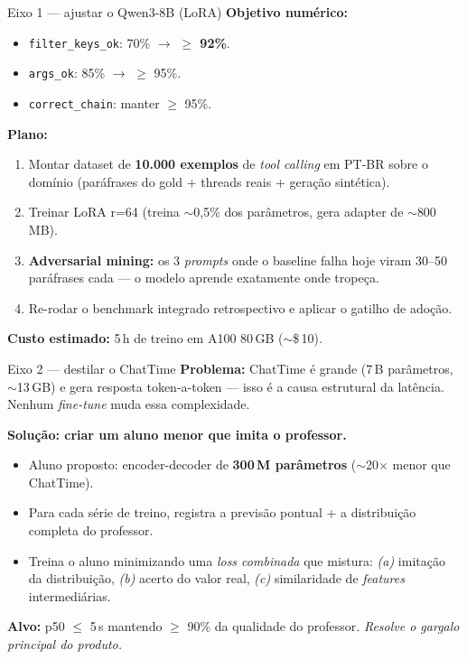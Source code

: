 \documentclass[10pt,aspectratio=169]{beamer}
\newcommand{\code}[1]{\texttt{\small #1}}
\begin{document}
\begin{frame}{Eixo 1 --- ajustar o Qwen3-8B (LoRA)}
\textbf{Objetivo numérico:}
\begin{itemize}\small
\item \code{filter\_keys\_ok}: 70\% $\to$ \textbf{$\ge$ 92\%}.
\item \code{args\_ok}: 85\% $\to$ $\ge$ 95\%.
\item \code{correct\_chain}: manter $\ge$ 95\%.
\end{itemize}

\textbf{Plano:}
\begin{enumerate}\small
\item Montar dataset de \textbf{10.000 exemplos} de
\emph{tool calling} em PT-BR sobre o domínio (paráfrases do gold
+ threads reais + geração sintética).
\item Treinar LoRA r=64 (treina $\sim$0,5\% dos parâmetros, gera
adapter de $\sim$800\,MB).
\item \textbf{Adversarial mining:} os 3 \emph{prompts} onde o
baseline falha hoje viram 30--50 paráfrases cada --- o modelo aprende
exatamente onde tropeça.
\item Re-rodar o benchmark integrado retrospectivo e aplicar o
gatilho de adoção.
\end{enumerate}

\textbf{Custo estimado:} 5\,h de treino em A100 80\,GB ($\sim$\$\,10).
\end{frame}

\begin{frame}{Eixo 2 --- destilar o ChatTime}
\textbf{Problema:} ChatTime é grande (7\,B parâmetros, $\sim$13\,GB) e
gera resposta token-a-token --- isso é a causa estrutural da
latência. Nenhum \emph{fine-tune} muda essa complexidade.

\textbf{Solução: criar um aluno menor que imita o professor.}
\begin{itemize}\small
\item Aluno proposto: encoder-decoder de \textbf{300\,M parâmetros}
($\sim$20$\times$ menor que ChatTime).
\item Para cada série de treino, registra a previsão pontual + a
distribuição completa do professor.
\item Treina o aluno minimizando uma \emph{loss combinada} que mistura:
\emph{(a)} imitação da distribuição, \emph{(b)} acerto do valor real,
\emph{(c)} similaridade de \emph{features} intermediárias.
\end{itemize}

\textbf{Alvo:} p50 $\le$ 5\,s mantendo $\ge$ 90\% da qualidade do
professor. \emph{Resolve o gargalo principal do produto.}
\end{frame}
\end{document}
